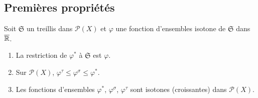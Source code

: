 \subsection{Premières propriétés}\label{SubSec:EnvlpPremProp}
\begin{prop}
Soit $\mathfrak{S}$ un treillis dans $\mathcal{P}(X)$ et $\varphi$ une fonction d'ensembles isotone de $\mathfrak{S}$ dans $\overline{\mathbb{R}}$.
 \begin{enumerate}
  \item  La restriction de $\varphi^*$ à $\mathfrak{S}$ est $\varphi$.
  \item Sur $\mathcal{P}(X)$, $\varphi^\tau \leq \varphi^\sigma \leq \varphi^*$.
  \item Les fonctions d'ensembles $\varphi^*$, $\varphi^\sigma$, $\varphi^\tau$ sont isotones (croissantes) dans $\mathcal{P}(X)$.
 \end{enumerate}
\end{prop}
